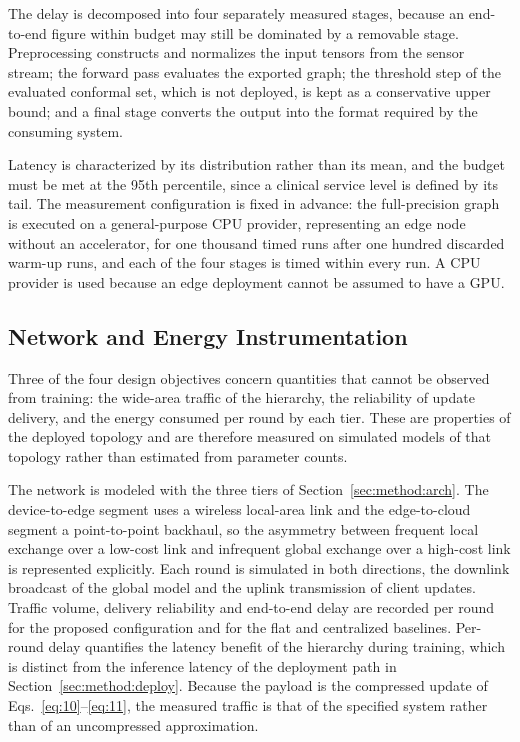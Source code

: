 The delay is decomposed into four separately measured stages, because an
end-to-end figure within budget may still be dominated by a removable stage.
Preprocessing constructs and normalizes the input tensors from the sensor
stream; the forward pass evaluates the exported graph; the threshold step of the evaluated conformal set, which is not deployed, is
kept as a conservative upper bound; and
a final stage converts the output into the format required by the consuming
system.

Latency is characterized by its distribution rather than its mean, and the
budget must be met at the 95th percentile, since a clinical service level is
defined by its tail. The measurement configuration is fixed in advance: the
full-precision graph is executed on a general-purpose CPU provider,
representing an edge node without an accelerator, for one thousand timed runs
after one hundred discarded warm-up runs, and each of the four stages is timed
within every run. A CPU provider is used because an edge deployment cannot be
assumed to have a GPU.

\subsection{Network and Energy Instrumentation}
\label{sec:method:instr}

Three of the four design objectives concern quantities that cannot be observed
from training: the wide-area traffic of the hierarchy, the reliability of update
delivery, and the energy consumed per round by each tier. These are properties
of the deployed topology and are therefore measured on simulated models of that
topology rather than estimated from parameter counts.

The network is modeled with the three tiers of Section~\ref{sec:method:arch}.
The device-to-edge segment uses a wireless local-area link and the
edge-to-cloud segment a point-to-point backhaul, so the asymmetry between
frequent local exchange over a low-cost link and infrequent global exchange
over a high-cost link is represented explicitly. Each round is simulated in
both directions, the downlink broadcast of the global model and the uplink
transmission of client updates. Traffic volume, delivery reliability and
end-to-end delay are recorded per round for the proposed configuration and for
the flat and centralized baselines. Per-round delay quantifies the latency
benefit of the hierarchy during training, which is distinct from the inference
latency of the deployment path in Section~\ref{sec:method:deploy}. Because the
payload is the compressed update of Eqs.~\eqref{eq:10}--\eqref{eq:11}, the
measured traffic is that of the specified system rather than of an
uncompressed approximation.

